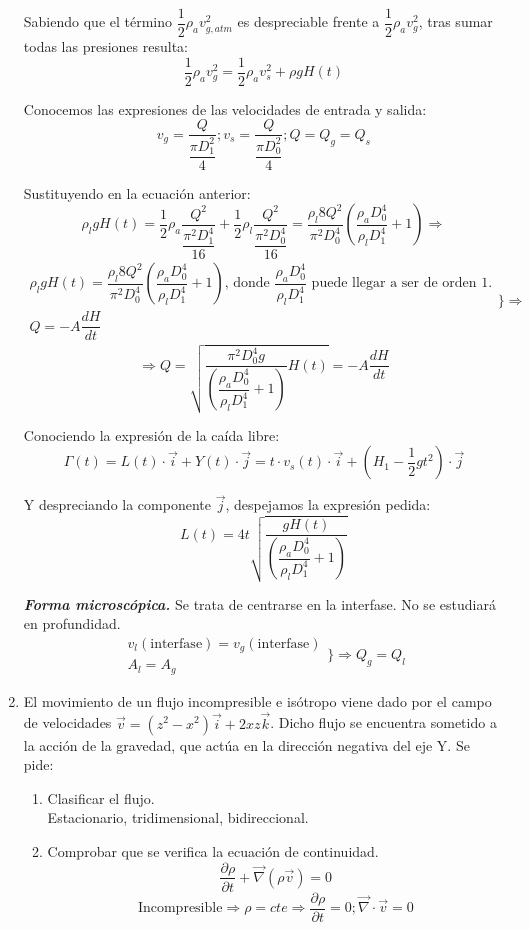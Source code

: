 \begin{enumerate}
Sabiendo que el término $\dfrac{1}{2}\rho_a v_{g,atm}^2$ es despreciable frente a $\dfrac{1}{2}\rho_a v_{g}^2$, tras sumar todas las presiones resulta:
\[\dfrac{1}{2}\rho_a v_{g}^2 = \dfrac{1}{2}\rho_a v_{s}^2 + \rho g H(t)\]

Conocemos las expresiones de las velocidades de entrada y salida:
\[v_g = \dfrac{Q}{\dfrac{\pi D_1^2}{4}}; v_s = \dfrac{Q}{\dfrac{\pi D_0^2}{4}}; Q = Q_g = Q_s\]

Sustituyendo en la ecuación anterior:
\[\rho_l g H(t) = \dfrac{1}{2} \rho_a \dfrac{Q^2}{\dfrac{\pi^2 D_1^4}{16}} + \dfrac{1}{2}\rho_l \dfrac{Q^2}{\dfrac{\pi^2 D_0^4}{16}} =
\dfrac{\rho_l 8 Q^2}{\pi^2 D_0^4}\left(\dfrac{\rho_a D_0^4}{\rho_l D_1^4} + 1\right) \Rightarrow\]
\[
	\begin{matrix}
		\rho_l g H(t)=\dfrac{\rho_l 8 Q^2}{\pi^2 D_0^4}\left(\dfrac{\rho_a D_0^4}{\rho_l D_1^4} + 1\right)\text{, donde }\dfrac{\rho_a D_0^4}{\rho_l D_1^4}\text{ puede llegar a ser de orden 1.}\\
		Q=-A\dfrac{dH}{dt}
	\end{matrix}
	\Biggr\} \Rightarrow\]
\[\Rightarrow Q = \sqrt{\dfrac{\pi^2 D_0^4 g}{\left(\dfrac{\rho_a D_0^4}{\rho_l D_1^4} + 1\right)} H(t)} = -A\dfrac{dH}{dt}\]

Conociendo la expresión de la caída libre:
\[\Gamma(t) = L(t)\cdot\vec{i} + Y(t)\cdot\vec{j} = t\cdot v_s(t) \cdot\vec{i} + (H_1 -\dfrac{1}{2}gt^2 )\cdot\vec{j}\]

Y despreciando la componente $\vec{j}$, despejamos la expresión pedida:
\[L(t) = 4t
\sqrt
{
	\dfrac
	{gH(t)}
	{
		\left(
		\dfrac
			{\rho_a D_0^4}
			{\rho_l D_1^4}
	 	+ 1
		\right)
	}
}
\]

\textit{\textbf{Forma microscópica.}}
	Se trata de centrarse en la interfase. No se estudiará en profundidad.
	\[\begin{matrix}
		v_l(\text{interfase}) = v_g(\text{interfase})\\
		A_l = A_g
	\end{matrix}
	\Biggr\} \Rightarrow Q_g = Q_l
	\]
	

\black
\item El movimiento de un flujo incompresible e isótropo viene dado por el campo de velocidades
$\vec{v} = (z^2 - x^2) \vec{i} + 2xz\vec{k}$. Dicho flujo se encuentra sometido a la acción de la gravedad, que actúa en la dirección negativa del eje Y. Se pide:
\begin{enumerate}
	\item Clasificar el flujo.\\
	\blue Estacionario, tridimensional, bidireccional.\\
	\black
	\item Comprobar que se verifica la ecuación de continuidad.\\
	\blue
		\[\dfrac{\partial \rho}{\partial t} + \vec{\nabla}(\rho \vec{v}) = 0\]
		\[\text{Incompresible}\Rightarrow \rho = cte \Rightarrow \dfrac{\partial \rho}{\partial t} = 0; \vec{\nabla} \cdot \vec{v} = 0\]
		

\end{enumerate}
\end{enumerate}
